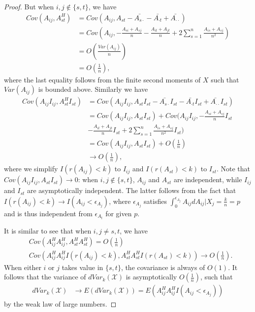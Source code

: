 \documentclass[12pt]{article}
\begin{document}
\begin{proof}
But when $i, j \notin \{s, t\}$, we have
\begin{align*}
Cov(A_{ij}, A^{H}_{st}) &= Cov(A_{ij},A_{st}-\bar{A_{s\cdot}}-\bar{A_{\cdot t}}+\bar{A_{\cdot \cdot}}) \\
&=Cov(A_{ij},-\frac{A_{si}+A_{sj}}{n}-\frac{A_{it}+A_{jt}}{n}+2\sum_{s=1}^{n}\frac{A_{is}+A_{sj}}{n^2}) \\
&=O(\frac{Var(A_{ij})}{n}) \\
&= O(\frac{1}{n}),
\end{align*}
where the last equality follows from the finite second moments of $X$ such that $Var(A_{ij})$ is bounded above. Similarly we have 
\begin{align*}
Cov(A_{ij}I_{ij}, A^{H}_{st}I_{st}) &= Cov(A_{ij}I_{ij},A_{st}I_{st}-\bar{A_{s\cdot}}I_{st}-\bar{A_{\cdot t}}I_{st}+\bar{A_{\cdot \cdot}}I_{st}) \\
&=Cov(A_{ij}I_{ij},A_{st}I_{st}) + Cov(A_{ij}I_{ij},-\frac{A_{si}+A_{sj}}{n}I_{st} \\
&-\frac{A_{it}+A_{jt}}{n}I_{st}+2\sum_{s=1}^{n}\frac{A_{is}+A_{sj}}{n^2}I_{st}) \\
&=Cov(A_{ij}I_{ij},A_{st}I_{st}) + O(\frac{1}{n}) \\
& \rightarrow O(\frac{1}{n}),
\end{align*}
where we simplify $I(r(A_{ij})<k)$ to $I_{ij}$ and $I(r(A_{st})<k)$ to $I_{st}$. Note that $Cov(A_{ij}I_{ij},A_{st}I_{st}) \rightarrow 0$: when $i, j \notin \{s, t\}$, $A_{ij}$ and $A_{st}$ are independent, while $I_{ij}$ and $I_{st}$ are asymptotically independent. The latter follows from the fact that $I(r(A_{ij})<k) \rightarrow I(A_{ij} < \epsilon_{A_{j}})$, where $\epsilon_{A_{j}}$ satisfies $\int_{0}^{\epsilon_{A_{j}}}A_{ij}dA_{ij} | X_{j}= \frac{k}{n}=p$ and is thus independent from $\epsilon_{A_{t}}$ for given $p$. 

It is similar to see that when $i, j \neq s, t$, we have 
\begin{align*}
&Cov(A^{H}_{ij}A^{H}_{ij}, A^{H}_{st}A^{H}_{st}) =O(\frac{1}{n}) \\
&Cov(A^{H}_{ij}A^{H}_{ij}I(r(A_{ij})<k), A^{H}_{st}A^{H}_{st}I(r(A_{st})<k)) \rightarrow O(\frac{1}{n}). 
\end{align*}
When either $i$ or $j$ takes value in $\{s,t\}$, the covariance is always of $O(1)$. It follows that the variance of $dVar_{k}(\mathcal{X})$ is asymptotically $O(\frac{1}{n})$, such that 
\begin{align*}
dVar_{k}(\mathcal{X}) &\rightarrow E(dVar_{k}(\mathcal{X}))=E(A^{H}_{ij}A^{H}_{ij}I(A_{ij}< \epsilon_{A_{j}}))
\end{align*}
by the weak law of large numbers.


\end{proof}
\end{document}

